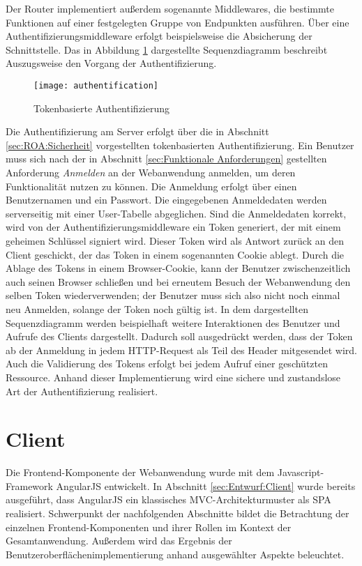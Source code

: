 Der Router implementiert außerdem sogenannte Middlewares, die bestimmte Funktionen auf einer festgelegten Gruppe von Endpunkten ausführen. Über eine Authentifizierungsmiddleware erfolgt beispielsweise die Absicherung der Schnittstelle. Das in Abbildung \ref{fig:authentification} dargestellte Sequenzdiagramm beschreibt Auszugsweise den Vorgang der Authentifizierung.
\begin{figure}[H]
\centering
\texttt{[image: authentification]} %
\caption{Tokenbasierte Authentifizierung}
\label{fig:authentification}
\end{figure}
Die Authentifizierung am Server erfolgt über die in Abschnitt \ref{sec:ROA:Sicherheit} vorgestellten tokenbasierten Authentifizierung. Ein Benutzer muss sich nach der in Abschnitt \ref{sec:Funktionale Anforderungen} gestellten Anforderung \glqq{}\emph{Anmelden}\grqq{} an der Webanwendung anmelden, um deren Funktionalität nutzen zu können. Die Anmeldung erfolgt über einen Benutzernamen und ein Passwort. Die eingegebenen Anmeldedaten werden serverseitig mit einer User-Tabelle abgeglichen. Sind die Anmeldedaten korrekt, wird von der Authentifizierungsmiddleware ein Token generiert, der mit einem geheimen Schlüssel signiert wird. Dieser Token wird als Antwort zurück an den Client geschickt, der das Token in einem sogenannten Cookie ablegt. Durch die Ablage des Tokens in einem Browser-Cookie, kann der Benutzer zwischenzeitlich auch seinen Browser schließen und bei erneutem Besuch der Webanwendung den selben Token wiederverwenden; der Benutzer muss sich also nicht noch einmal neu Anmelden, solange der Token noch gültig ist. In dem dargestellten Sequenzdiagramm werden beispielhaft weitere Interaktionen des Benutzer und Aufrufe des Clients dargestellt. Dadurch soll ausgedrückt werden, dass der Token ab der Anmeldung in jedem HTTP-Request als Teil des Header mitgesendet wird. Auch die Validierung des Tokens erfolgt bei jedem Aufruf einer geschützten Ressource. Anhand dieser Implementierung wird eine sichere und zustandslose Art der Authentifizierung realisiert.

\section{Client}

Die Frontend-Komponente der Webanwendung wurde mit dem Javascript-Framework \mbox{AngularJS} entwickelt. In Abschnitt \ref{sec:Entwurf:Client} wurde bereits ausgeführt, dass \mbox{AngularJS} ein klassisches MVC-Architekturmuster als \ac{SPA} realisiert. Schwerpunkt der nachfolgenden Abschnitte bildet die Betrachtung der einzelnen Frontend-Komponenten und ihrer Rollen im Kontext der Gesamtanwendung. Außerdem wird das Ergebnis der Benutzeroberflächenimplementierung anhand ausgewählter Aspekte beleuchtet.

